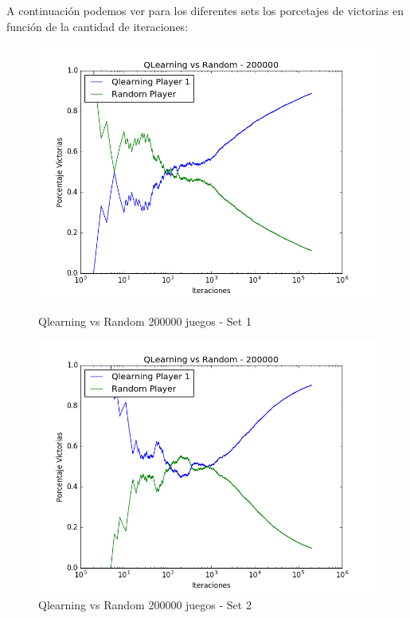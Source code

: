 A continuación podemos ver para los diferentes sets los porcetajes de victorias en función de la cantidad de iteraciones:


\begin{figure}[h]
 \centering
 \begin{minipage}{.45\textwidth}
	\centering
	\includegraphics[scale=0.35]{img1/QlearningVsRandom_200000_6x5_hernan.png}
        \caption{Qlearning vs Random 200000 juegos - Set 1}
  \end{minipage}
 \begin{minipage}{.5\textwidth}
	\centering
	\includegraphics[scale=0.35]{img1/QlearningVsRandom_200000_6x5_cyntia.png}
        \caption{Qlearning vs Random 200000 juegos - Set 2}
  \end{minipage}
\end{figure}


